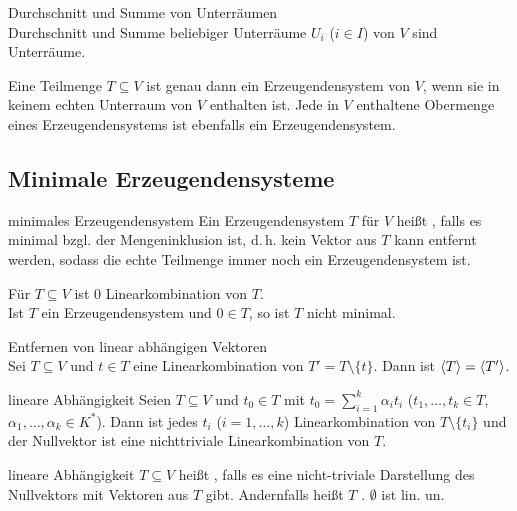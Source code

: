 \begin{Lemma}{Durchschnitt und Summe von Unterräumen} \\
    Durchschnitt und Summe beliebiger Unterräume $U_i$
    ($i \in I$) von $V$ sind Unterräume.
\end{Lemma}

\begin{Kor}
    Eine Teilmenge $T \subseteq V$ ist genau dann ein Erzeugendensystem von
    $V$, wenn sie in keinem echten Unterraum von $V$ enthalten ist.
    Jede in $V$ enthaltene Obermenge eines Erzeugendensystems ist ebenfalls
    ein Erzeugendensystem.
\end{Kor}

\subsection{%
    Minimale Erzeugendensysteme%
}

\begin{Def}{minimales Erzeugendensystem}
    Ein Erzeugendensystem $T$ für $V$ heißt , falls es minimal
    bzgl. der Mengeninklusion ist, d.\,h. kein Vektor aus $T$ kann entfernt
    werden, sodass die echte Teilmenge immer noch ein Erzeugendensystem ist.
\end{Def}

\begin{Beobachtung}
    Für $T \subseteq V$ ist $0$ Linearkombination von $T$. \\
    Ist $T$ ein Erzeugendensystem und $0 \in T$, so ist $T$ nicht minimal.
\end{Beobachtung}

\begin{Lemma}{Entfernen von linear abhängigen Vektoren} \\
    Sei $T \subseteq V$ und $t \in T$ eine Linearkombination von
    $T' = T \setminus \{t\}$. Dann ist $\langle T \rangle = \langle T' \rangle$.
\end{Lemma}

\begin{Lemma}{lineare Abhängigkeit}
    Seien $T \subseteq V$ und $t_0 \in T$ mit
    $t_0 = \sum_{i=1}^k \alpha_i t_i$ ($t_1, \ldots, t_k \in T$,
    $\alpha_1, \ldots, \alpha_k \in K^\ast$).
    Dann ist jedes $t_i$ ($i = 1, \ldots, k$) Linearkombination von
    $T \setminus \{t_i\}$ und der Nullvektor ist eine nichttriviale
    Linearkombination von $T$.
\end{Lemma}

\begin{Def}{lineare Abhängigkeit}
    $T \subseteq V$ heißt , falls es eine nicht-triviale
    Darstellung des Nullvektors mit Vektoren aus $T$ gibt.
    Andernfalls heißt $T$ .
    $\emptyset$ ist lin. un.
\end{Def}

